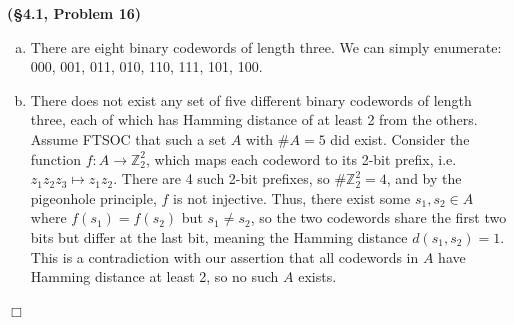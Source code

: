 \documentclass[12pt]{article}
\theoremstyle{definition}
\newenvironment{Solution}{\noindent {\sc Solution.}}{$\Box$ \vspace{2 ex}}
\begin{document}
\vspace{0.5cm}

\begin{Solution}
{\bf (\S4.1, Problem 16)}\\
\begin{enumerate}[(a)]
\item There are eight binary codewords of length three. We can simply enumerate: 000, 001, 011, 010, 110, 111, 101, 100.
\item There does not exist any set of five different binary codewords of length three, each of which has Hamming distance of at least 2 from the others. Assume FTSOC that such a set $A$ with $\# A =5$ did exist. Consider the function $f : A \to \mathbb Z_2^2$, which maps each codeword to its 2-bit prefix, i.e. $z_1 z_2 z_3 \mapsto z_1 z_2$. There are 4 such 2-bit prefixes, so $\# \mathbb Z_2^2 = 4$, and by the pigeonhole principle, $f$ is not injective. Thus, there exist some $s_1, s_2 \in A$ where $f(s_1) = f(s_2)$ but $s_1 \ne s_2$, so the two codewords share the first two bits but differ at the last bit, meaning the Hamming distance $d(s_1, s_2)=1$. This is a contradiction with our assertion that all codewords in $A$ have Hamming distance at least 2, so no such $A$ exists.
\end{enumerate}
\end{Solution}

\vspace{0.5cm}
\end{document}
